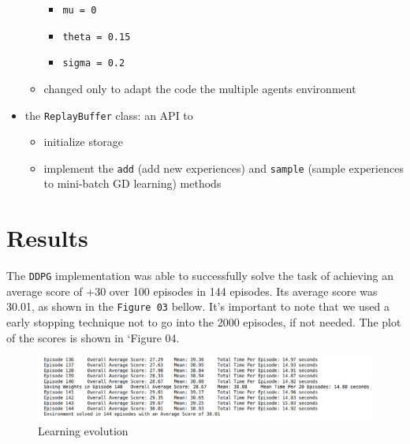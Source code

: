 \documentclass[
]{article}
\providecommand{\tightlist}{%
  \setlength{\itemsep}{0pt}\setlength{\parskip}{0pt}}
\begin{document}
\begin{itemize}
\begin{itemize}
    \begin{itemize}
    \tightlist
    \item
      \texttt{mu\ =\ 0}
    \item
      \texttt{theta\ =\ 0.15}
    \item
      \texttt{sigma\ =\ 0.2}
    \end{itemize}
  \item
    changed only to adapt the code the multiple agents environment
  \end{itemize}
\item
  the \texttt{ReplayBuffer} class: an API to

  \begin{itemize}
  \tightlist
  \item
    initialize storage
  \item
    implement the \texttt{add} (add new experiences) and \texttt{sample}
    (sample experiences to mini-batch GD learning) methods
  \end{itemize}
\end{itemize}

\pagebreak

\hypertarget{results}{%
\section{Results}\label{results}}

The \texttt{DDPG} implementation was able to successfully solve the task
of achieving an average score of +30 over 100 episodes in 144 episodes.
Its average score was 30.01, as shown in the \texttt{Figure\ 03} bellow.
It's important to note that we used a early stopping technique not to go
into the 2000 episodes, if not needed. The plot of the scores is shown
in `Figure 04.

\begin{figure}
\centering
\includegraphics{imgs/results_1.png}
\caption{Learning evolution}
\end{figure}
\end{document}
